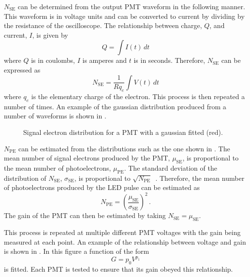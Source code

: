 $N_{\text{SE}}$ can be determined from the output PMT waveform in the following manner.
This waveform is in voltage units and can be converted to current by dividing by the resistance of the oscilloscope.
The relationship between charge, $Q$, and current, $I$, is given by
\begin{equation}
  Q = \int I(t) \, dt
\end{equation}
where $Q$ is in coulombs, $I$ is amperes and $t$ is in seconds.
Therefore, $N_{\text{SE}}$ can be expressed as
\begin{equation}
  N_{\text{SE}} = \frac{1}{R q_{e}} \int V(t) \, dt
\end{equation}
where $q_{e}$ is the elementary charge of the electron.
This process is then repeated a number of times.
An example of the gaussian distribution produced from a number of waveforms is shown in .

\begin{figure}[h]
  \begin{adjustbox}{max totalsize={.8\textwidth}, center}
    
  \end{adjustbox}
  \caption[Signal electron distribution for a PMT]{Signal electron distribution for a PMT with a gaussian fitted (red).}
  \label{fig:N_se}
\end{figure}

$N_{\text{PE}}$ can be estimated from the distributions such as the one shown in .
The mean number of signal electrons produced by the PMT, $\mu_{\text{SE}}$, is proportional to the mean number of photoelectrons, $\mu_{\text{PE}}$.
The standard deviation of the distribution of $N_{\text{SE}}$, $\sigma_{\text{SE}}$, is proportional to $\sqrt{N_{\text{PE}}}$~\cite{photoelectrons}.
Therefore, the mean number of photoelectrons produced by the LED pulse can be estimated as
\begin{equation}
  N_{\text{PE}} = \left( \frac{ \mu_{\text{SE}} }{ \sigma_{\text{SE}} }  \right)^{2} \, .
\end{equation}
The gain of the PMT can then be estimated by taking $N_{\text{SE}} = \mu_{\text{SE}}$.

This process is repeated at multiple different PMT voltages with the gain being measured at each point.
An example of the relationship between voltage and gain is shown in .
In this figure a function of the form
\begin{equation}
  G = p_{0} V^{p_{1}}
\end{equation}
is fitted.
Each PMT is tested to ensure that its gain obeyed this relationship.

